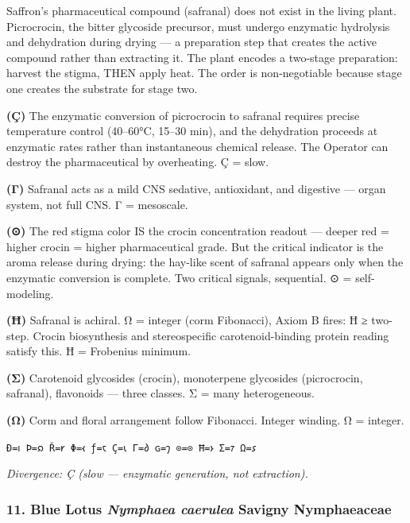 Saffron's pharmaceutical compound (safranal) does not exist in the
living plant. Picrocrocin, the bitter glycoside precursor, must undergo
enzymatic hydrolysis and dehydration during drying --- a preparation
step that creates the active compound rather than extracting it. The
plant encodes a two-stage preparation: harvest the stigma, THEN apply
heat. The order is non-negotiable because stage one creates the
substrate for stage two.

\textbf{(Ç)} The enzymatic conversion of picrocrocin to safranal
requires precise temperature control (40--60°C, 15--30 min), and the
dehydration proceeds at enzymatic rates rather than instantaneous
chemical release. The Operator can destroy the pharmaceutical by
overheating. Ç = slow.

\textbf{(Γ)} Safranal acts as a mild CNS sedative, antioxidant, and
digestive --- organ system, not full CNS. Γ = mesoscale.

\textbf{(⊙)} The red stigma color IS the crocin concentration readout
--- deeper red = higher crocin = higher pharmaceutical grade. But the
critical indicator is the aroma release during drying: the hay-like
scent of safranal appears only when the enzymatic conversion is
complete. Two critical signals, sequential. ⊙ = self-modeling.

\textbf{(Ħ)} Safranal is achiral. Ω = integer (corm Fibonacci), Axiom B
fires: Ħ ≥ two-step. Crocin biosynthesis and stereospecific
carotenoid-binding protein reading satisfy this. Ħ = Frobenius minimum.

\textbf{(Σ)} Carotenoid glycosides (crocin), monoterpene glycosides
(picrocrocin, safranal), flavonoids --- three classes. Σ = many
heterogeneous.

\textbf{(Ω)} Corm and floral arrangement follow Fibonacci. Integer
winding. Ω = integer.

\texttt{Ð=𐑦\ Þ=𐑸\ Ř=𐑾\ Φ=𐑬\ ƒ=𐑱\ Ç=𐑧\ Γ=𐑔\ ɢ=𐑠\ ⊙=⊙\ Ħ=𐑶\ Σ=𐑳\ Ω=𐑭}

\emph{Divergence: Ç (slow --- enzymatic generation, not extraction).}

\hypertarget{blue-lotus-nymphaea-caerulea-savigny-nymphaeaceae}{%
\subsubsection{\texorpdfstring{11. Blue Lotus \textbar{} \emph{Nymphaea
caerulea} Savigny \textbar{}
Nymphaeaceae}{11. Blue Lotus \textbar{} Nymphaea caerulea Savigny \textbar{} Nymphaeaceae}}\label{blue-lotus-nymphaea-caerulea-savigny-nymphaeaceae}}

